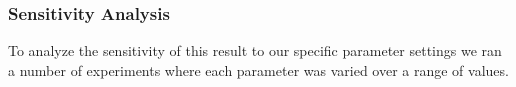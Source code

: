 

\subsubsection*{Sensitivity Analysis}

To analyze the sensitivity of this result to our specific parameter
settings we ran a number of experiments where each parameter was
varied over a range of values.



